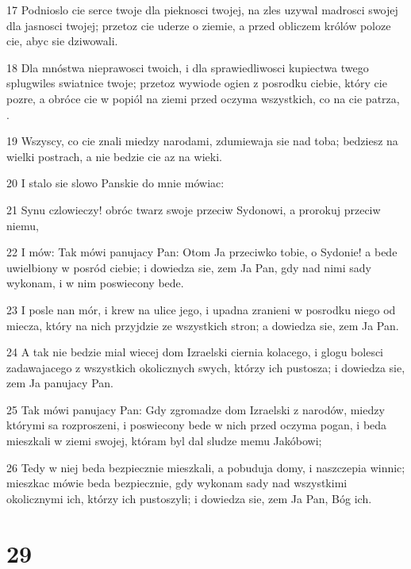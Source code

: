 \par 17 Podnioslo cie serce twoje dla pieknosci twojej, na zles uzywal madrosci swojej dla jasnosci twojej; przetoz cie uderze o ziemie, a przed obliczem królów poloze cie, abyc sie dziwowali.
\par 18 Dla mnóstwa nieprawosci twoich, i dla sprawiedliwosci kupiectwa twego splugwiles swiatnice twoje; przetoz wywiode ogien z posrodku ciebie, który cie pozre, a obróce cie w popiól na ziemi przed oczyma wszystkich, co na cie patrza, .
\par 19 Wszyscy, co cie znali miedzy narodami, zdumiewaja sie nad toba; bedziesz na wielki postrach, a nie bedzie cie az na wieki.
\par 20 I stalo sie slowo Panskie do mnie mówiac:
\par 21 Synu czlowieczy! obróc twarz swoje przeciw Sydonowi, a prorokuj przeciw niemu,
\par 22 I mów: Tak mówi panujacy Pan: Otom Ja przeciwko tobie, o Sydonie! a bede uwielbiony w posród ciebie; i dowiedza sie, zem Ja Pan, gdy nad nimi sady wykonam, i w nim poswiecony bede.
\par 23 I posle nan mór, i krew na ulice jego, i upadna zranieni w posrodku niego od miecza, który na nich przyjdzie ze wszystkich stron; a dowiedza sie, zem Ja Pan.
\par 24 A tak nie bedzie mial wiecej dom Izraelski ciernia kolacego, i glogu bolesci zadawajacego z wszystkich okolicznych swych, którzy ich pustosza; i dowiedza sie, zem Ja panujacy Pan.
\par 25 Tak mówi panujacy Pan: Gdy zgromadze dom Izraelski z narodów, miedzy którymi sa rozproszeni, i poswiecony bede w nich przed oczyma pogan, i beda mieszkali w ziemi swojej, któram byl dal sludze memu Jakóbowi;
\par 26 Tedy w niej beda bezpiecznie mieszkali, a pobuduja domy, i naszczepia winnic; mieszkac mówie beda bezpiecznie, gdy wykonam sady nad wszystkimi okolicznymi ich, którzy ich pustoszyli; i dowiedza sie, zem Ja Pan, Bóg ich.

\chapter{29}

